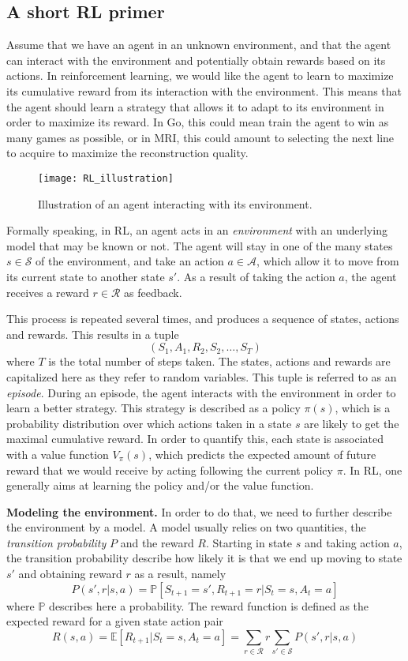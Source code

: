 \subsection{A short RL primer}
Assume that we have an agent in an unknown environment, and that the agent can interact with the environment and potentially obtain rewards based on its actions. In reinforcement learning, we would like the agent to learn to maximize its cumulative reward from its interaction with the environment. This means that the agent should learn a strategy that allows it to adapt to its environment in order to maximize its reward. In Go, this could mean train the agent to win as many games as possible, or in MRI, this could amount to selecting the next line to acquire to maximize the reconstruction quality.  


\begin{figure}[!ht]
    \centering
    \texttt{[image: RL\_illustration]}
    \caption{Illustration of an agent interacting with its environment.}
\end{figure}

Formally speaking, in RL, an agent acts in an \textit{environment} with an underlying model that may be known or not. The agent will stay in one of the many states $s \in \mathcal{S}$ of the environment, and take an action $a \in \mathcal{A}$, which allow it to move from its current state to another state $s'$. As a result of taking the action $a$, the agent receives a reward $r\in \mathcal{R}$ as feedback.

This process is repeated several times, and produces a sequence of states, actions and rewards. This results in a tuple 
$$(S_1,A_1,R_2, S_2, \ldots, S_T)$$
where $T$ is the total number of steps taken. The states, actions and rewards are capitalized here as they refer to random variables. This tuple is referred to as an \textit{episode}. During an episode, the agent interacts with the environment in order to learn a better strategy. This strategy is described as a policy $\pi(s)$, which is a probability distribution over which actions taken in a state $s$ are likely to get the maximal cumulative reward. In order to quantify this, each state is associated with a value function $V_\pi(s)$, which predicts the expected amount of future reward that we would receive by acting following the current policy $\pi$. In RL, one generally aims at learning the policy and/or the value function.

\textbf{Modeling the environment.} In order to do that, we need to further describe the environment by a model. A model usually relies on two quantities, the \textit{transition probability} $P$ and the reward $R$. Starting in state $s$ and taking action $a$, the transition probability describe how likely it is that we end up moving to state $s'$ and obtaining reward $r$ as a result, namely
$$P(s',r|s,a) = \mathbb{P}[S_{t+1}=s', R_{t+1}=r | S_t = s, A_t = a]$$
where $\mathbb{P}$ describes here a probability. The reward function is defined as the expected reward for a given state action pair
$$R(s,a) = \mathbb{E}[R_{t+1}|S_t = s, A_t = a] = \sum_{r\in\mathcal{R}} r \sum_{s' \in \mathcal{S}} P(s',r|s,a)$$


